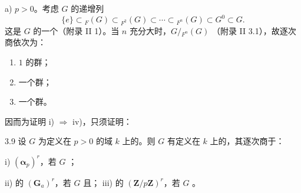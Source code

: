 a) $p>0$。考虑 $G$ 的递增列
\[\{e\}\subset {}_F(G)\subset {}_{F^2}(G)\subset\cdots\subset {}_{F^n}(G)\subset G^0\subset G.\]
这是 $G$ 的一个（附录 II 1）。当 $n$ 充分大时，$G/{}_{F^n}(G)$ （附录 II 3.1），故逐次商依次为：
\begin{enumerate}
\item[(1)]  $1$ 的群；
\item[(2)] 一个群；
\item[(3)] 一个群。
\end{enumerate}
因而为证明 i) $\Rightarrow$ iv)，只须证明：
\begin{SGAresult}{}{3.9}
设 $G$ 为定义在 $p>0$ 的域 $k$ 上的。则 $G$ 有定义在 $k$ 上的，其逐次商于：

i) $(\boldsymbol\alpha_p)^r$，若 $G$ ；

ii) 的 $(\mathbf G_a)^r$，若 $G$ 且；
iii) 的 $(\mathbf Z/p\mathbf Z)^r$，若 $G$ 。
\end{SGAresult}
